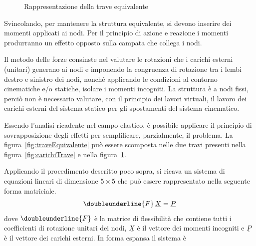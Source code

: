 \begin{figure}
{\begin{tikzpicture}[xscale=.8]
    

 \end{tikzpicture}\label{fig:momentiTrave}}
    \caption{Rappresentazione della trave equivalente}
\end{figure}

Svincolando, per mantenere la struttura equivalente, si devono inserire dei momenti applicati ai nodi. Per il principio di azione e reazione i momenti produrranno un effetto opposto sulla campata che collega i nodi. 

Il metodo delle forze consinste nel valutare le rotazioni che i carichi esterni (unitari) generano ai nodi e imponendo la congruenza di rotazione tra i lembi destro e sinistro dei nodi, nonché applicando le condizioni al contorno cinematiche e/o statiche, isolare i momenti incogniti. La struttura è a nodi fissi, perciò non è necessario valutare, con il principio dei lavori virtuali, il lavoro dei carichi esterni del sistema statico per gli spostamenti del sistema cinematico.

Essendo l'analisi ricadente nel campo elastico, è possibile applicare il principio di sovrapposizione degli effetti per semplificare, parzialmente, il problema. La figura~\ref{fig:traveEquivalente} può essere scomposta nelle due travi presenti nella figura~\ref{fig:carichiTrave} e nella figura~\ref{fig:momentiTrave}.

Applicando il procedimento descritto poco sopra, si ricava un sistema di equazioni lineari di dimensione $5\times 5$ che può essere rappresentato nella seguente forma matriciale.
\begin{equation*}
    \doubleunderline{F}\, \underline{X} = \underline{P}
\end{equation*}
dove $\doubleunderline{F}$ è la matrice di flessibilità che contiene tutti i coefficienti di rotazione unitari dei nodi, $\underline{X}$ è il vettore dei momenti incogniti e $\underline{P}$ è il vettore dei carichi esterni. In forma espansa il sistema è

